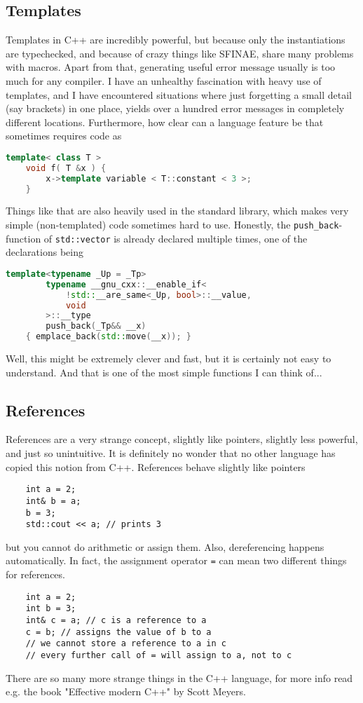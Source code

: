 \documentclass{scrartcl}
\begin{document}
\subsection{Templates}
Templates in C++ are incredibly powerful, but because only the instantiations are typechecked, and because of crazy things like SFINAE, share many problems with macros.
Apart from that, generating useful error message usually is too much for any compiler.
I have an unhealthy fascination with heavy use of templates, and I have encountered situations where just forgetting a small detail (say brackets) in one place, yields over a hundred error messages in completely different locations.
Furthermore, how clear can a language feature be that sometimes requires code as
\begin{lstlisting}[language = c++]
    template< class T >
    void f( T &x ) {
        x->template variable < T::constant < 3 >;
    }
\end{lstlisting}
Things like that are also heavily used in the standard library, which makes very simple (non-templated) code sometimes hard to use.
Honestly, the \lstinline{push_back}-function of \lstinline{std::vector} is already declared multiple times, one of the declarations being
\begin{lstlisting}[language = c++]
    template<typename _Up = _Tp>
        typename __gnu_cxx::__enable_if<
            !std::__are_same<_Up, bool>::__value,
            void
        >::__type
        push_back(_Tp&& __x)
    { emplace_back(std::move(__x)); }
\end{lstlisting}
Well, this might be extremely clever and fast, but it is certainly not easy to understand.
And that is one of the most simple functions I can think of...

\subsection{References}
References are a very strange concept, slightly like pointers, slightly less powerful, and just so unintuitive.
It is definitely no wonder that no other language has copied this notion from C++.
References behave slightly like pointers
\begin{lstlisting}
    int a = 2;
    int& b = a;
    b = 3;
    std::cout << a; // prints 3
\end{lstlisting}
but you cannot do arithmetic or assign them.
Also, dereferencing happens automatically.
In fact, the assignment operator \lstinline{=} can mean two different things for references.
\begin{lstlisting}
    int a = 2;
    int b = 3;
    int& c = a; // c is a reference to a
    c = b; // assigns the value of b to a
    // we cannot store a reference to a in c
    // every further call of = will assign to a, not to c
\end{lstlisting}
There are so many more strange things in the C++ language, for more info read e.g. the book "Effective modern C++" by Scott Meyers.
\end{document}
